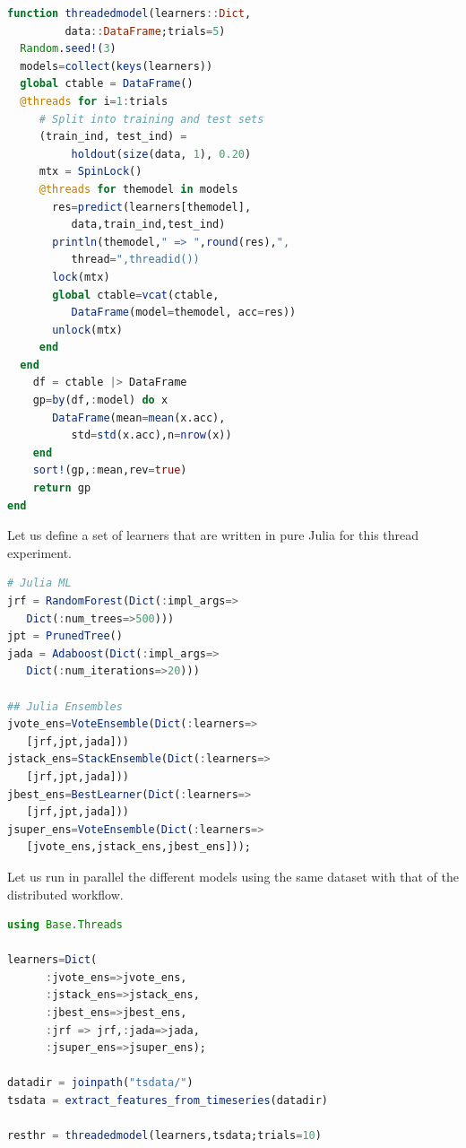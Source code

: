 \documentclass{juliacon}
\begin{document}
\begin{lstlisting}[language = Julia]
function threadedmodel(learners::Dict,
         data::DataFrame;trials=5)
  Random.seed!(3)
  models=collect(keys(learners))
  global ctable = DataFrame()
  @threads for i=1:trials
     # Split into training and test sets
     (train_ind, test_ind) = 
          holdout(size(data, 1), 0.20)
     mtx = SpinLock()
     @threads for themodel in models
       res=predict(learners[themodel],
          data,train_ind,test_ind)
       println(themodel," => ",round(res),", 
          thread=",threadid())
       lock(mtx)
       global ctable=vcat(ctable,
          DataFrame(model=themodel, acc=res))
       unlock(mtx)
     end
  end
    df = ctable |> DataFrame
    gp=by(df,:model) do x
       DataFrame(mean=mean(x.acc),
          std=std(x.acc),n=nrow(x))
    end
    sort!(gp,:mean,rev=true)
    return gp
end
\end{lstlisting}

Let us define a set of learners that are written in pure Julia for this thread experiment.

\begin{lstlisting}[language = Julia]
# Julia ML
jrf = RandomForest(Dict(:impl_args=>
   Dict(:num_trees=>500)))
jpt = PrunedTree()
jada = Adaboost(Dict(:impl_args=>
   Dict(:num_iterations=>20)))

## Julia Ensembles
jvote_ens=VoteEnsemble(Dict(:learners=>
   [jrf,jpt,jada]))
jstack_ens=StackEnsemble(Dict(:learners=>
   [jrf,jpt,jada]))
jbest_ens=BestLearner(Dict(:learners=>
   [jrf,jpt,jada]))
jsuper_ens=VoteEnsemble(Dict(:learners=>
   [jvote_ens,jstack_ens,jbest_ens]));
\end{lstlisting}

Let us run in parallel the different models using the same dataset with that of the distributed workflow.

\begin{lstlisting}[language = Julia]
using Base.Threads

learners=Dict(
      :jvote_ens=>jvote_ens,
      :jstack_ens=>jstack_ens,
      :jbest_ens=>jbest_ens,
      :jrf => jrf,:jada=>jada,
      :jsuper_ens=>jsuper_ens);
      
datadir = joinpath("tsdata/")
tsdata = extract_features_from_timeseries(datadir)

resthr = threadedmodel(learners,tsdata;trials=10)
\end{lstlisting}
\end{document}
